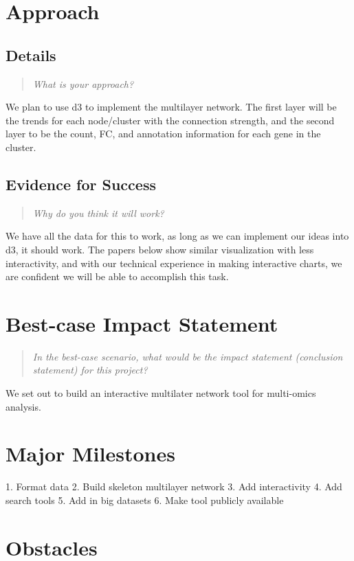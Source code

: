 \documentclass{proc}
\begin{document}
\section{Approach}
\subsection{Details}
\begin{quote}
\textit{What is your approach?}
\end{quote}

We plan to use d3 to implement the multilayer network. The first layer will be the trends for each node/cluster with the connection strength, and the second layer to be the count, FC, and annotation information for each gene in the cluster. 

\subsection{Evidence for Success}
\begin{quote}
\textit{Why do you think it will work?} 
\end{quote}

We have all the data for this to work, as long as we can implement our ideas into d3, it should work. The papers below show similar visualization with less interactivity, and with our technical experience in making interactive charts, we are confident we will be able to accomplish this task.

\section{Best-case Impact Statement}
\begin{quote}
\textit{In the best-case scenario, what would be the impact statement (conclusion statement) for this project? \cite{wijk2005value, pike2009science}}
\end{quote}

We set out to build an interactive multilater network tool for multi-omics analysis.

\section{Major Milestones}

1. Format data
2. Build skeleton multilayer network
3. Add interactivity
4. Add search tools
5. Add in big datasets
6. Make tool publicly available

\section{Obstacles}
\end{document}
